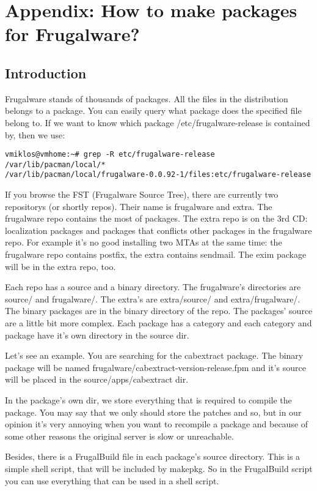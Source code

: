 \chapter{Appendix: How to make packages for Frugalware?}

\section{Introduction}
Frugalware stands of thousands of packages. All the files in the distribution belongs to a package. You can easily query what package does the specified file belong to. If we want to know which package /etc/frugalware-release is contained by, then we use:
\begin{verbatim}
vmiklos@vmhome:~# grep -R etc/frugalware-release /var/lib/pacman/local/*
/var/lib/pacman/local/frugalware-0.0.92-1/files:etc/frugalware-release
\end{verbatim}
If you browse the FST (Frugalware Source Tree), there are currently two repositorys (or shortly repos). Their name is frugalware and extra. The frugalware repo contains the most of packages. The extra repo is on the 3rd CD: localization packages and packages that conflicts other packages in the frugalware repo. For example it's no good installing two MTAs at the same time: the frugalware repo contains postfix, the extra contains sendmail. The exim package will be in the extra repo, too.

Each repo has a source and a binary directory. The frugalware's directories are source/ and frugalware/. The extra's are extra/source/ and extra/frugalware/. The binary packages are in the binary directory of the repo. The packages' source are a little bit more complex. Each package has a category and each category and package have it's own directory in the source dir.

Let's see an example. You are searching for the cabextract package. The binary package will be named frugalware/cabextract-version-release.fpm and it's source will be placed in the source/apps/cabextract dir.

In the package's own dir, we store everything that is required to compile the package. You may say that we only should store the patches and so, but in our opinion it's very annoying when you want to recompile a package and because of some other reasons the original server is slow or unreachable.

Besides, there is a FrugalBuild file in each package's source directory. This is a simple shell script, that will be included by makepkg. So in the FrugalBuild script you can use everything that can be used in a shell script.

